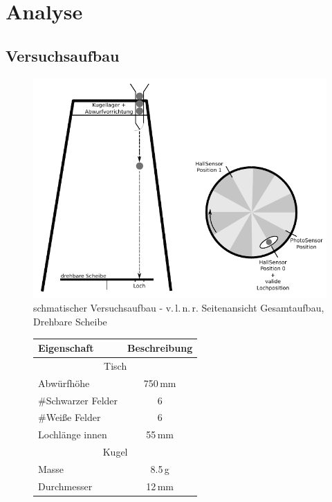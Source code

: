 \chapter{Analyse}\label{k_analyse}

\section{Versuchsaufbau}
\begin{figure}[h] \centering
	\includegraphics[width=\textwidth]{images/aufbau.pdf}
	\caption{schmatischer Versuchsaufbau - v.\,l.\,n.\,r. Seitenansicht Gesamtaufbau, Drehbare Scheibe}
	\label{img:versuchsaufbau}
\end{figure}

\begin{figure}[h] \centering
\begin{tabular}{lc} 
	\textbf{Eigenschaft} 	& \textbf{Beschreibung}	\\
	\toprule
	\multicolumn{2}{c}{Tisch}\\ 
	\midrule
	Abwürfhöhe 	& 750\,mm \\
	\#Schwarzer Felder 	& 6 \\
	\#Weiße Felder 	& 6 \\
	Lochlänge innen 	& 55\,mm \\
	\midrule 
	\multicolumn{2}{c}{Kugel}\\ 
	\midrule
	Masse 	& 8.5\,g \\
	Durchmesser 	& 12\,mm \\
	\bottomrule
\end{tabular}
\end{figure}

